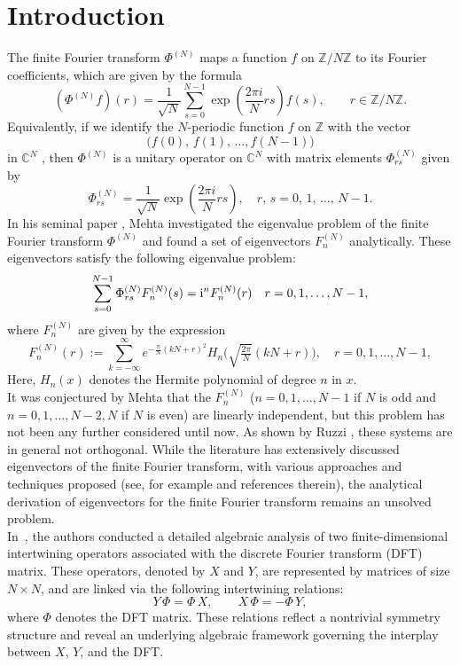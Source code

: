 \documentclass[12 pt]{amsart}
\numberwithin{equation}{section}
\newcommand\ii{{\rm i}}
\begin{document}
\section{Introduction}
The finite Fourier transform  $\Phi^{(N)}$ maps a function $f$ on $\mathbb{Z}/N\mathbb{Z}$ to its Fourier coefficients, which are given by the formula \cite{Koo}
\begin{equation}
(\Phi^{(N)}f)(r)=\frac{1}{\sqrt{N}}\sum_{s=0}^{N-1}\exp\left(\frac{2\pi i}{N}rs\right)f(s),\qquad r\in\mathbb{Z}/N\mathbb{Z}.
\end{equation}
Equivalently, if we identify the $N$-periodic function $f$ on $\mathbb{Z}$ with the vector
\begin{equation*}
\big(f(0),\,f(1),\,\dots,f(N-1)\big)
\end{equation*}
in $\mathbb{C}^N$ , then $\Phi ^{(N)}$ is a unitary operator on $\mathbb{C}^N$ with matrix elements $\Phi_{rs}^{(N)}$ given by  $$\Phi_{rs}^{(N)}=\frac{1}{\sqrt{N}}\exp(\frac{2\pi i}{N}rs),\quad r,\,s=0,\,1,\,\dots,\,N-1.$$\indent
In his seminal paper \cite{Mehta}, Mehta investigated the eigenvalue problem of the finite Fourier transform $\Phi^{(N)}$  and found a set of eigenvectors $F_n^{(N)}$ analytically. These eigenvectors satisfy the following eigenvalue problem:
\begin{equation}
\sum_{s=0}^{N-1}\Phi_{rs}^{(N)}F_n^{(N)}(s) =
\ii^nF_n^{(N)}(r) \quad r=0,1,\ldots,N-1, \label{1.2}
\end{equation}
where $F_n^{(N)}$ are given by the expression
\begin{equation}
F_n^{(N)}(r):=\sum_{k=-\infty }^{\infty }
e^{-\frac{\pi}{N}\left( kN+r\right)^2}H_n
\Big(\sqrt{\tfrac{2\pi}{N}}(kN+r)\Big),\quad r=0,1,\ldots,N-1, \label{1.3}
\end{equation}
Here, $H_n\left( x\right)$ denotes the Hermite polynomial of degree $n$ in $x$.\\
It was conjectured by Mehta \cite{Mehta} that the $F_n^{(N)}$
($n=0,1,\ldots,N-1$
if $N$ is odd and $n=0,1,\ldots,N-2,N$ if $N$ is even) are linearly
independent,
but this problem has not been any further considered until now. As shown by
Ruzzi \cite{Ruzzi}, these systems are in general not orthogonal.
While the literature has extensively discussed eigenvectors of the finite Fourier transform, with various approaches and techniques proposed (see, for example \cite{Mehta, Matv, MesNat, AA2016}  and references therein), the analytical derivation of eigenvectors for the finite Fourier transform remains an unsolved problem.\\
In~\cite{At}, the authors conducted a detailed algebraic analysis of two finite-dimensional intertwining operators associated with the discrete Fourier transform (DFT) matrix. These operators, denoted by \( X \) and \( Y \), are represented by matrices of size \( N \times N \), and are linked via the following intertwining relations:
\begin{equation}
Y \, \Phi = \Phi \, X, \qquad X \, \Phi = -\Phi \, Y,
\end{equation}
where \( \Phi \) denotes the DFT matrix. These relations reflect a nontrivial symmetry structure and reveal an underlying algebraic framework governing the interplay between \( X \), \( Y \), and the DFT.
\end{document}

